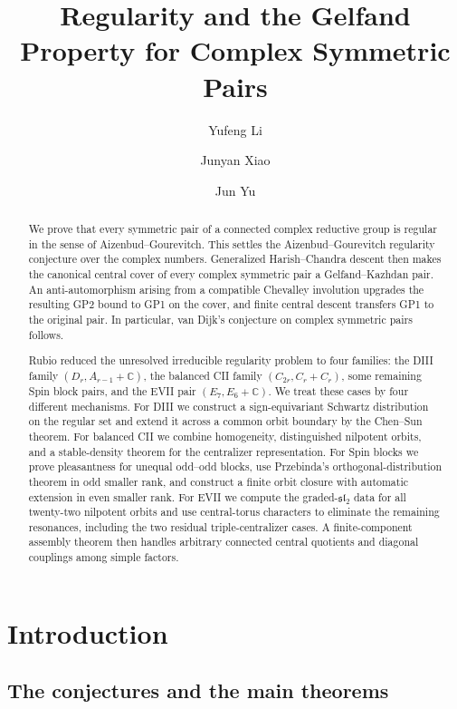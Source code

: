 \documentclass[11pt,reqno]{amsart}
\title[Regularity of complex symmetric pairs]{Regularity and the Gelfand Property for Complex Symmetric Pairs}
\author[Y.F.~Li]{Yufeng Li}
\author[J.Y.~Xiao]{Junyan Xiao}
\author[J.~Yu]{Jun Yu}
\date{}
\numberwithin{equation}{section}
\theoremstyle{definition}
\theoremstyle{remark}
\newcommand{\C}{\mathbb C}
\begin{document}
\raggedbottom

\begin{abstract}
We prove that every symmetric pair of a connected complex reductive group is
regular in the sense of Aizenbud--Gourevitch.  This settles the
Aizenbud--Gourevitch regularity conjecture over the complex numbers.  Generalized
Harish--Chandra descent then makes the canonical central cover of every complex
symmetric pair a Gelfand--Kazhdan pair.  An anti-automorphism arising from a
compatible Chevalley involution upgrades the resulting GP2 bound to GP1 on the
cover, and finite central descent transfers GP1 to the original pair.
In particular, van Dijk's conjecture on complex symmetric pairs follows.

Rubio reduced the unresolved irreducible regularity problem to four families: the
DIII family $(D_r,A_{r-1}+\C)$, the balanced CII family
$(C_{2r},C_r+C_r)$, some remaining Spin block pairs, and the EVII pair
$(E_7,E_6+\C)$.  We treat these cases by four different mechanisms.  For DIII
we construct a sign-equivariant Schwartz distribution on the regular set and
extend it across a common orbit boundary by the Chen--Sun theorem.  For balanced
CII we combine homogeneity, distinguished nilpotent orbits, and a stable-density
theorem for the centralizer representation.  For Spin blocks we prove pleasantness for unequal odd--odd blocks, use
Przebinda's orthogonal-distribution theorem in odd smaller rank, and construct
a finite orbit closure with automatic extension in even smaller rank.  For
EVII we compute the graded-$\mathfrak{sl}_2$ data for all twenty-two nilpotent
orbits and use central-torus characters to eliminate the remaining resonances,
including the two residual triple-centralizer cases.  A finite-component
assembly theorem then handles arbitrary connected central quotients and diagonal
couplings among simple factors.
\end{abstract}

\maketitle
\setcounter{tocdepth}{2}
\tableofcontents

\section{Introduction}\label{sec:introduction}

\subsection{The conjectures and the main theorems}
\end{document}
